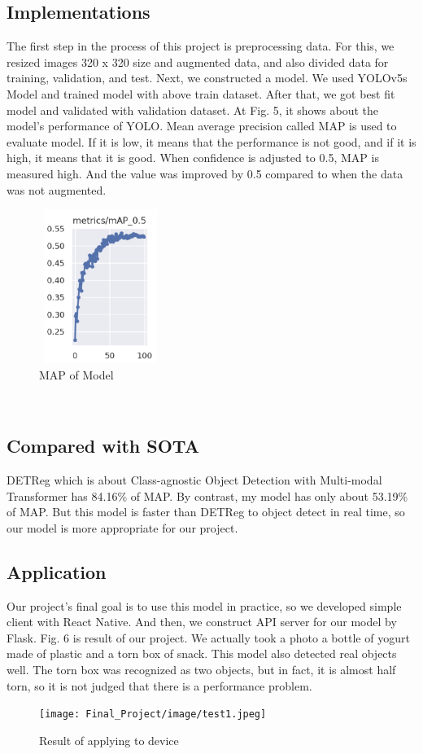 \documentclass{article}
\begin{document}
{\subsection{Implementations}
{The first step in the process of this project is preprocessing data. For this, we resized images 320 x 320 size and augmented data, and also divided data for training, validation, and test. Next, we constructed a model. We used YOLOv5s Model and trained model with above train dataset.
After that, we got best fit model and validated with validation dataset. At Fig. 5, it shows about the model's performance of YOLO. Mean average precision called MAP is used to evaluate model. If it is low, it means that the performance is not good, and if it is high, it means that it is good. When confidence is adjusted to 0.5, MAP is measured high. And the value was improved by 0.5 compared to when the data was not augmented.
 }\\
\begin{figure}[!htb]
    \centering
    \includegraphics[width=4cm,height=5cm]{Final_Project/image/map.png}
    \caption{MAP of Model}
\end{figure}\\

\subsection{Compared with SOTA}
{DETReg which is about Class-agnostic Object Detection with Multi-modal Transformer has 84.16\% of MAP.\cite{maaz2022class} By contrast, my model has only about 53.19\% of MAP. But this model is faster than DETReg to object detect in real time, so our model is more appropriate for our project.}

\subsection{Application}
{Our project's final goal is to use this model in practice, so we developed simple client with React Native. And then, we construct API server for our model by Flask. Fig. 6 is result of our project. We actually took a photo a bottle of yogurt made of plastic and a torn box of snack. This model also detected real objects well. The torn box was recognized as two objects, but in fact, it is almost half torn, so it is not judged that there is a performance problem. }
\begin{figure}[!htb]
    \centering
    \texttt{[image: Final\_Project/image/test1.jpeg]}
    \caption{Result of applying to device}
    \label{fig:my_label}
\end{figure}\\

}
\end{document}
